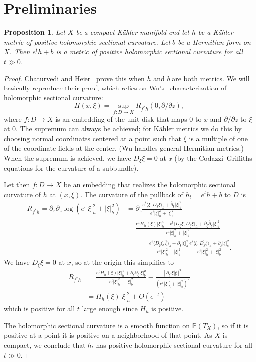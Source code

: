 \documentclass[10pt,a4paper]{amsart}
\newtheorem{prop}[theo]{Proposition}
\newcommand{\kk}[1]{\mathbb{#1}}
\def\<{\langle}
\def\>{\rangle}
\def\ov#1{\overline{#1}}
\def\hsc{holomorphic sectional curvature}
\begin{document}
\section{Preliminaries}

\begin{prop}
\label{prop:positive}
Let $X$ be a compact K\"ahler manifold and let $h$ be a K\"ahler metric of
positive \hsc. Let $b$ be a Hermitian form on $X$.
Then $e^t h + b$ is a metric of positive \hsc{} for all $t \gg 0$.
\end{prop}

\begin{proof}
Chaturvedi and Heier~\cite{chaturvedi2020hermitian} prove this when $h$ and $b$
are both metrics.
We will basically reproduce their proof, which relies on
Wu's~\cite{wu1973remark} characterization of \hsc:
$$
H(x, \xi) = \sup_{f : D \to X} R_{f^*h}(0, \partial/\partial z),
$$
where $f : D \to X$ is an embedding of the unit disk that maps
$0$ to $x$ and $\partial/\partial z$ to $\xi$ at $0$.
The supremum can always be achieved; for K\"ahler metrics we do this by
choosing normal coordinates centered at a point such that $\xi$ is a multiple
of one of the coordinate fields at the center. (Wu handles general Hermitian
metrics.) When the supremum is achieved, we have $D_\xi \xi = 0$ at $x$ (by the
Codazzi--Griffiths equations for the curvature of a subbundle).

Let then $f : D \to X$ be an embedding that realizes the \hsc{} of $h$ at
$(x,\xi)$.
The curvature of the pullback of $h_t = e^t h + b$ to $D$ is
\begin{align*}
R_{f^*h}
= \partial_z \bar\partial_z \log(e^t |\xi|^2_h + |\xi|^2_b)
&= \partial_z \frac{e^t \<\xi, \ov{D_\xi\xi}\>_h + \bar\partial_\xi |\xi|^2_b}{e^t |\xi|^2_h + |\xi|^2_b}
\\
&= \frac{e^t H_h(\xi)|\xi|^4_h + e^t \<D_\xi \xi, \ov{D_\xi\xi}\>_h + \partial_\xi\bar\partial_\xi |\xi|^2_b}{e^t |\xi|^2_h + |\xi|^2_b}
\\
&\qquad
- \frac{e^t \<D_\xi \xi, \ov{\xi}\>_h + \partial_\xi |\xi|^2_b}{e^t |\xi|^2_h + |\xi|^2_b}
\frac{e^t \<\xi, \ov{D_\xi\xi}\>_h + \bar\partial_\xi |\xi|^2_b}{e^t |\xi|^2_h + |\xi|^2_b}.
\end{align*}
We have $D_\xi \xi = 0$ at $x$, so at the origin this simplifies to
\begin{align*}
R_{f^*h}
&= \frac{e^t H_h(\xi)|\xi|^4_h + \partial_\xi\bar\partial_\xi |\xi|^2_b}{e^t |\xi|^2_h + |\xi|^2_b}
- \frac{|\, \partial_\xi |\xi|^2_b \,|^2}{(e^t |\xi|^2_h + |\xi|^2_b)^2}
\\
&= H_h(\xi) |\xi|^2_h + O(e^{-t})
\end{align*}
which is positive for all $t$ large enough since $H_h$ is positive.

The \hsc{} is a smooth function on $\kk P(T_X)$, so if it is positive at a
point it is positive on a neighborhood of that point.
As $X$ is compact, we conclude that $h_t$ has positive \hsc{} for all $t \gg 0$.
\end{proof}
\end{document}
